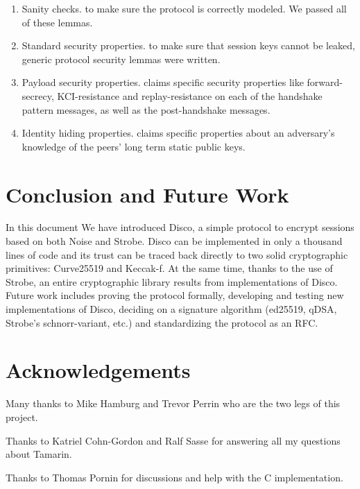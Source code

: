 \documentclass{article}
\begin{document}
\begin{enumerate}
    \item Sanity checks. to make sure the protocol is correctly modeled. We passed all of these lemmas.
    \item Standard security properties. to make sure that session keys cannot be leaked, generic protocol security lemmas were written.
    \item Payload security properties. \cite[Section 7.7 of the Noise Protocol Framework]{noise} claims specific security properties like forward-secrecy, KCI-resistance and replay-resistance on each of the handshake pattern messages, as well as the post-handshake messages.
    \item Identity hiding properties. \cite[Section 7.8 of the Noise Protocol Framework]{noise} claims specific properties about an adversary's knowledge of the peers' long term static public keys.
\end{enumerate}


\section{Conclusion and Future Work}

In this document We have introduced Disco, a simple protocol to encrypt sessions based on both Noise and Strobe. Disco can be implemented in only a thousand lines of code and its trust can be traced back directly to two solid cryptographic primitives: Curve25519 and Keccak-f. At the same time, thanks to the use of Strobe, an entire cryptographic library results from implementations of Disco. Future work includes proving the protocol formally, developing and testing new implementations of Disco, deciding on a signature algorithm (ed25519, qDSA, Strobe's schnorr-variant, etc.) and standardizing the protocol as an RFC.

\section*{Acknowledgements}

Many thanks to Mike Hamburg and Trevor Perrin who are the two legs of this project.

Thanks to Katriel Cohn-Gordon and Ralf Sasse for answering all my questions about Tamarin.

Thanks to Thomas Pornin for discussions and help with the C implementation.

\newpage
\printbibliography
\end{document}
